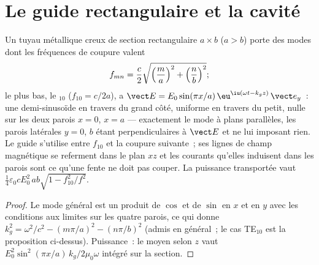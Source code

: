 \section{Le guide rectangulaire et la cavité}

\begin{proposition}\label{prop:b2:guided-waves:rectangular}
Un tuyau métallique creux de section rectangulaire $a \times b$ ($a > b$) porte
des modes dont les fréquences de coupure valent
\[
f_{mn} = \frac c2\sqrt{\Bigl(\frac ma\Bigr)^2 + \Bigl(\frac nb\Bigr)^2} ;
\]
le plus bas, le \emph{$_{10}$} ($f_{10} = c/2a$), a $\vect E = E_0\sin
(\pi x/a)\,\eu^{\iu(\omega t - k_gz)}\,\vect e_y$~: une demi-sinusoïde en travers du grand
côté, uniforme en travers du petit, nulle sur les deux parois $x = 0$,
$x = a$ --- exactement le mode à plans parallèles, les parois latérales $y = 0$, $b$
étant perpendiculaires à $\vect E$ et ne lui imposant rien. Le guide s'utilise
entre $f_{10}$ et la coupure suivante~; ses lignes de champ magnétique
se referment dans le plan $xz$ et les courants qu'elles induisent dans les parois
sont ce qu'une fente ne doit pas couper. La puissance transportée vaut $\tfrac14\varepsilon_0cE_0^2\,ab
\sqrt{1 - f_{10}^2/f^2}$.
\end{proposition}

\begin{proof}
Le mode général est un produit de $\cos$ et de $\sin$ en $x$ et en $y$ avec les
conditions aux limites sur les quatre parois, ce qui donne $k_g^2 = \omega^2/c^2 - (m\pi/a)^2
- (n\pi/b)^2$ (admis en général~; le cas TE$_{10}$ est la proposition
ci-dessus). Puissance~: le  moyen selon $z$ vaut $E_0^2\sin^2(\pi x/a)
\,k_g/2\mu_0\omega$ intégré sur la section.
\end{proof}

